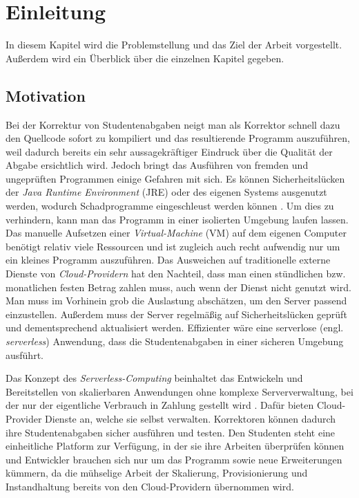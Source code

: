 \chapter{Einleitung}
In diesem Kapitel wird die Problemstellung und das Ziel der Arbeit vorgestellt.
Außerdem wird ein Überblick über die einzelnen Kapitel gegeben.

\section{Motivation}
Bei der Korrektur von Studentenabgaben neigt man als Korrektor schnell dazu den Quellcode sofort 
zu kompiliert und das resultierende Programm auszuführen, 
weil dadurch bereits ein sehr aussagekräftiger Eindruck über die Qualität der Abgabe ersichtlich wird. 
Jedoch bringt das Ausführen von fremden und ungeprüften Programmen einige Gefahren mit sich.
Es können Sicherheitslücken der \textit{Java Runtime Environment} (JRE) \cite{Jre}
oder des eigenen Systems ausgenutzt werden, wodurch Schadprogramme eingeschleust
werden können \cite{CveJreVuln}.
Um dies zu verhindern, kann man das Programm in einer isolierten Umgebung laufen lassen.
Das manuelle Aufsetzen einer \textit{Virtual-Machine} (VM) \cite{RedHatVM} auf dem eigenen Computer
benötigt relativ viele Ressourcen und ist zugleich auch recht aufwendig nur um ein kleines Programm auszuführen.
Das Ausweichen auf traditionelle externe Dienste von \textit{Cloud-Providern} hat den Nachteil,
dass man einen stündlichen bzw. monatlichen festen Betrag zahlen muss,
auch wenn der Dienst nicht genutzt wird. Man muss im Vorhinein grob die Auslastung abschätzen,
um den Server passend einzustellen. Außerdem muss der Server regelmäßig auf
Sicherheitslücken geprüft und dementsprechend aktualisiert werden.
Effizienter wäre eine serverlose (engl. \textit{serverless}) Anwendung, dass die
Studentenabgaben in einer sicheren Umgebung ausführt.

Das Konzept des \textit{Serverless-Computing} beinhaltet das Entwickeln und Bereitstellen
von skalierbaren Anwendungen ohne komplexe Serververwaltung, bei der nur der eigentliche Verbrauch
in Zahlung gestellt wird \cite{CioGov}.
Dafür bieten Cloud-Provider Dienste an, welche sie selbst
verwalten. Korrektoren können dadurch ihre Studentenabgaben sicher ausführen und testen.
Den Studenten steht eine einheitliche Platform zur Verfügung, in der sie ihre Arbeiten überprüfen können und
Entwickler brauchen sich nur um das Programm sowie neue Erweiterungen kümmern, da die mühselige Arbeit
der Skalierung, Provisionierung und Instandhaltung bereits von den Cloud-Providern übernommen wird.

